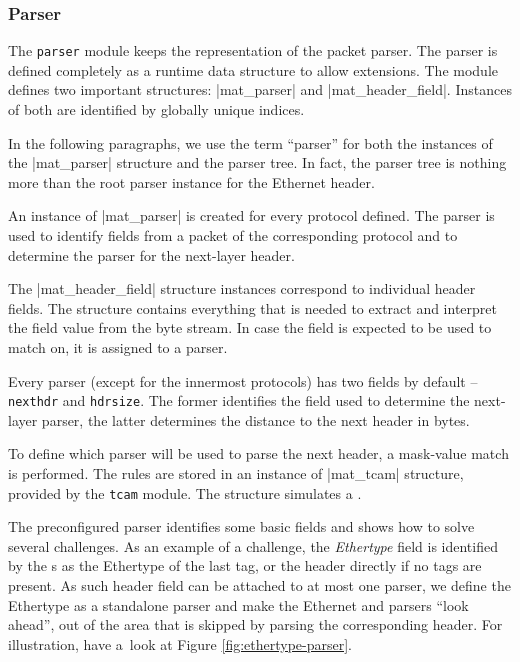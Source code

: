\subsubsection{Parser}

The \texttt{parser} module keeps the representation of the packet parser. The
parser is defined completely as a runtime data structure to allow extensions.
The module defines two important structures: \struct|mat_parser| and
\struct|mat_header_field|. Instances of both are identified by globally unique indices.

In the following paragraphs, we use the term ``parser'' for both the instances of
the \struct|mat_parser| structure and the parser tree. In fact, the parser tree is
nothing more than the root parser instance for the Ethernet header.

An instance of \struct|mat_parser| is created for every protocol defined. The
parser is used to identify fields from a packet of the corresponding protocol
and to determine the parser for the next-layer header.

The \struct|mat_header_field| structure instances correspond to individual
header fields. The structure contains everything that is needed to extract and
interpret the field value from the byte stream. In case the field is expected
to be used to match on, it is assigned to a parser.

Every parser (except for the innermost protocols) has two fields by default
-- \Verb|nexthdr| and \Verb|hdrsize|. The former identifies the field used
to determine the next-layer parser, the latter determines the distance to the
next header in bytes.

To define which parser will be used to parse the next header, a mask-value
match is performed. The rules are stored in an instance of \struct|mat_tcam| structure,
provided by the \texttt{tcam} module. The structure simulates a .

The preconfigured parser identifies some basic fields and shows how to solve
several challenges. As an example of a challenge, the \emph{Ethertype} field is
identified by the s as the Ethertype of the last  tag, or the
 header directly if no  tags are present. As such header field can
be attached to at most one parser, we define the Ethertype as a standalone
parser and make the Ethernet and  parsers ``look ahead'', out of the
area that is skipped by parsing the corresponding header. For illustration, have a~look at
Figure \ref{fig:ethertype-parser}.

